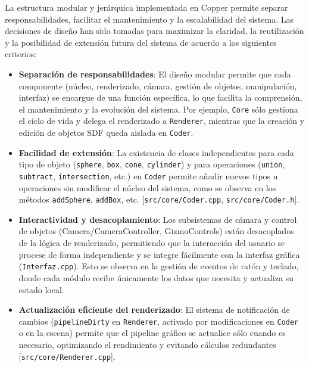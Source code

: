 La estructura modular y jerárquica implementada en Copper permite separar
responsabilidades, facilitar el mantenimiento y la escalabilidad del sistema.
Las decisiones de diseño han sido tomadas para maximizar la claridad, la
reutilización y la posibilidad de extensión futura del sistema de acuerdo a los
siguientes criterios:
\begin{itemize}
    \item \textbf{Separación de responsabilidades}: El diseño modular permite que cada componente (núcleo, renderizado, cámara, gestión de objetos, manipulación, interfaz) se encargue de una función específica, lo que facilita la comprensión, el mantenimiento y la evolución del sistema. Por ejemplo, \texttt{Core} sólo gestiona el ciclo de vida y delega el renderizado a \texttt{Renderer}, mientras que la creación y edición de objetos SDF queda aislada en \texttt{Coder}.
    \item \textbf{Facilidad de extensión}: La existencia de clases independientes para cada tipo de objeto (\texttt{sphere}, \texttt{box}, \texttt{cone}, \texttt{cylinder}) y para operaciones (\texttt{union}, \texttt{subtract}, \texttt{intersection}, etc.) en \texttt{Coder} permite añadir nuevos tipos u operaciones sin modificar el núcleo del sistema, como se observa en los métodos \texttt{addSphere}, \texttt{addBox}, etc. [\texttt{src/core/Coder.cpp}, \texttt{src/core/Coder.h}].
    \item \textbf{Interactividad y desacoplamiento}: Los subsistemas de cámara y control de objetos (Camera/CameraController, GizmoControls) están desacoplados de la lógica de renderizado, permitiendo que la interacción del usuario se procese de forma independiente y se integre fácilmente con la interfaz gráfica (\texttt{Interfaz.cpp}). Esto se observa en la gestión de eventos de ratón y teclado, donde cada módulo recibe únicamente los datos que necesita y actualiza su estado local.
    \item \textbf{Actualización eficiente del renderizado}: El sistema de notificación de cambios (\texttt{pipelineDirty} en \texttt{Renderer}, activado por modificaciones en \texttt{Coder} o en la escena) permite que el pipeline gráfico se actualice sólo cuando es necesario, optimizando el rendimiento y evitando cálculos redundantes [\texttt{src/core/Renderer.cpp}].
\end{itemize}